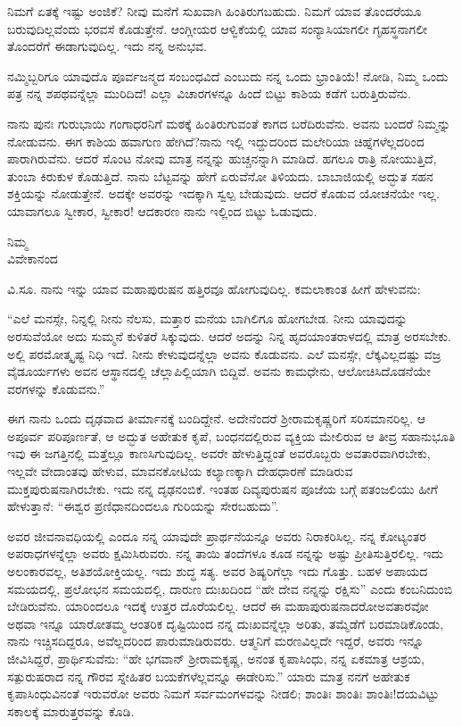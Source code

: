 ನಿಮಗೆ ಏತಕ್ಕೆ ಇಷ್ಟು ಅಂಜಿಕೆ? ನೀವು ಮನೆಗೆ ಸುಖವಾಗಿ ಹಿಂತಿರುಗಬಹುದು. ನಿಮಗೆ ಯಾವ ತೊಂದರೆಯೂ ಬರುವುದಿಲ್ಲವೆಂದು ಭರವಸೆ ಕೊಡುತ್ತೇನೆ. ಆಂಗ್ಲೀಯರ ಆಳ್ವಿಕೆಯಲ್ಲಿ ಯಾವ ಸಂನ್ಯಾಸಿಯಾಗಲೀ ಗೃಹಸ್ಥನಾಗಲೀ ತೊಂದರೆಗೆ ಈಡಾಗುವುದಿಲ್ಲ. ಇದು ನನ್ನ ಅನುಭವ.

ನಮ್ಮಿಬ್ಬರಿಗೂ ಯಾವುದೊ ಪೂರ್ವಜನ್ಮದ ಸಂಬಂಧವಿದೆ ಎಂಬುದು ನನ್ನ ಒಂದು ಭ್ರಾಂತಿಯೆ! ನೋಡಿ, ನಿಮ್ಮ ಒಂದು ಪತ್ರ ನನ್ನ ಶಪಥವನ್ನೆಲ್ಲಾ ಮುರಿದಿದೆ! ಎಲ್ಲಾ ವಿಚಾರಗಳನ್ನೂ ಹಿಂದೆ ಬಿಟ್ಟು ಕಾಶಿಯ ಕಡೆಗೆ ಬರುತ್ತಿರುವೆನು.

ನಾನು ಪುನಃ ಗುರುಭಾಯಿ ಗಂಗಾಧರನಿಗೆ ಮಠಕ್ಕೆ ಹಿಂತಿರುಗುವಂತೆ ಕಾಗದ ಬರೆದಿರುವೆನು. ಅವನು ಬಂದರೆ ನಿಮ್ಮನ್ನು ನೋಡುವನು. ಈಗ ಕಾಶಿಯ ಹವಾಗುಣ ಹೇಗಿದೆ?ನಾನು ಇಲ್ಲಿ ಇದ್ದುದರಿಂದ ಮಲೇರಿಯಾ ಚಿಹ್ನೆಗಳೆಲ್ಲದರಿಂದ ಪಾರಾಗಿರುವೆನು. ಆದರೆ ಸೊಂಟ ನೋವು ಮಾತ್ರ ನನ್ನನ್ನು ಹುಚ್ಚನನ್ನಾಗಿ ಮಾಡಿದೆ. ಹಗಲೂ ರಾತ್ರಿ ನೋಯುತ್ತಿದೆ, ತುಂಬಾ ಕಿರುಕುಳ ಕೊಡುತ್ತಿದೆ. ನಾನು ಬೆಟ್ಟವನ್ನು ಹೇಗೆ ಏರುವೆನೋ ತಿಳಿಯದು. ಬಾಬಾಜಿಯಲ್ಲಿ ಅದ್ಭುತ ಸಹನ ಶಕ್ತಿಯನ್ನು ನೋಡುತ್ತೇನೆ. ಅದಕ್ಕೇ ಅವರನ್ನು ಇದಕ್ಕಾಗಿ ಸ್ವಲ್ಪ ಬೇಡುವುದು. ಆದರೆ ಕೊಡುವ ಯೋಚನೆಯೇ ಇಲ್ಲ. ಯಾವಾಗಲೂ ಸ್ವೀಕಾರ, ಸ್ವೀಕಾರ! ಆದಕಾರಣ ನಾನು ಇಲ್ಲಿಂದ ಬಿಟ್ಟು ಓಡುವುದು.
\vspace{-0.3cm}

{\flushright
ನಿಮ್ಮ\\ವಿವೇಕಾನಂದ\par}

ವಿ.ಸೂ. \enginline{-}ನಾನು ಇನ್ನು ಯಾವ ಮಹಾಪುರುಷನ ಹತ್ತಿರವೂ ಹೋಗುವುದಿಲ್ಲ. ಕಮಲಾಕಾಂತ ಹೀಗೆ ಹೇಳುವನು:

“ಎಲೆ ಮನಸ್ಸೇ, ನಿನ್ನಲ್ಲಿ ನೀನು ನೆಲಸು, ಮತ್ತಾರ ಮನೆಯ ಬಾಗಿಲಿಗೂ ಹೋಗಬೇಡ. ನೀನು ಯಾವುದನ್ನು ಅರಸುವೆಯೋ ಅದು ಸುಮ್ಮನೆ ಕುಳಿತರೆ ಸಿಕ್ಕುವುದು. ಆದರೆ ಅದನ್ನು ನಿನ್ನ ಹೃದಯಾಂತರಾಳದಲ್ಲಿ ಮಾತ್ರ ಅರಸಬೇಕು. ಅಲ್ಲಿ ಪರಮೋತ್ಕೃಷ್ಟ ನಿಧಿ ಇದೆ. ನೀನು ಕೇಳುವುದನ್ನೆಲ್ಲಾ ಅವನು ಕೊಡುವನು. ಎಲೆ ಮನಸ್ಸೇ, ಲೆಕ್ಕವಿಲ್ಲದಷ್ಟು ವಜ್ರ ವೈಡೂರ್ಯಗಳು ಅವನ ಆಸ್ಥಾನದಲ್ಲಿ ಚೆಲ್ಲಾಪಿಲ್ಲಿಯಾಗಿ ಬಿದ್ದಿವೆ. ಅವನು ಕಾಮಧೇನು, ಆಲೋಚಿಸಿದೊಡನೆಯೇ ವರಗಳನ್ನು ಕೊಡುವನು.”

ಈಗ ನಾನು ಒಂದು ದೃಢವಾದ ತೀರ್ಮಾನಕ್ಕೆ ಬಂದಿದ್ದೇನೆ. ಅದೇನೆಂದರೆ ಶ‍್ರೀರಾಮ\break ಕೃಷ್ಣರಿಗೆ ಸರಿಸಮಾನರಿಲ್ಲ. ಆ ಅಪೂರ್ವ ಪರಿಪೂರ್ಣತೆ, ಆ ಅದ್ಭುತ ಅಹೇತುಕ ಕೃಪೆ, ಬಂಧನದಲ್ಲಿರುವ ವ್ಯಕ್ತಿಯ ಮೇಲಿರುವ ಆ ತೀವ್ರ ಸಹಾನುಭೂತಿ ಇವು ಈ ಜಗತ್ತಿನಲ್ಲಿ ಮತ್ತೆಲ್ಲೂ ಕಾಣಸಿಗುವುದಿಲ್ಲ. ಅವರೇ ಹೇಳುತ್ತಿದ್ದಂತೆ ಅವರೊಬ್ಬರು ಅವತಾರವಾಗಿರಬೇಕು, ಇಲ್ಲವೇ ವೇದಾಂತವು ಹೇಳುವ, ಮಾವನಕೋಟಿಯ ಕಲ್ಯಾಣಕ್ಕಾಗಿ ದೇಹಧಾರಣೆ ಮಾಡಿರುವ ಮುಕ್ತಪುರುಷನಾಗಿರಬೇಕು. ಇದು ನನ್ನ ದೃಢನಂಬಿಕೆ. ಇಂತಹ ದಿವ್ಯಪುರುಷನ ಪೂಜೆಯ ಬಗ್ಗೆ ಪತಂಜಲಿಯು ಹೀಗೆ ಹೇಳುತ್ತಾನೆ: “ಈಶ್ವರ ಪ್ರಣಿಧಾನದಿಂದಲೂ ಗುರಿಯನ್ನು ಸೇರಬಹುದು”.

ಅವರ ಜೀವನಾವಧಿಯಲ್ಲಿ ಎಂದೂ ನನ್ನ ಯಾವುದೇ ಪ್ರಾರ್ಥನೆಯನ್ನೂ ಅವರು ನಿರಾಕರಿಸಿಲ್ಲ. ನನ್ನ ಕೋಟ್ಯಂತರ ಅಪರಾಧಗಳನ್ನೆಲ್ಲಾ ಅವರು ಕ್ಷಮಿಸಿರುವರು. ನನ್ನ ತಾಯಿ ತಂದೆಗಳೂ ಕೂಡ ನನ್ನನ್ನು ಅಷ್ಟು ಪ್ರೀತಿಸುತ್ತಿರಲಿಲ್ಲ. ಇದು ಅಲಂಕಾರವಲ್ಲ, ಅತಿಶಯೋಕ್ತಿಯಲ್ಲ. ಇದು ಶುದ್ಧ ಸತ್ಯ. ಅವರ ಶಿಷ್ಯರಿಗೆಲ್ಲಾ ಇದು ಗೊತ್ತು. ಬಹಳ ಅಪಾಯದ ಸಮಯದಲ್ಲಿ, ಪ್ರಲೋಭನ ಸಮಯದಲ್ಲಿ, ದಾರುಣ ದುಃಖದಿಂದ “ಹೇ ದೇವ ನನ್ನನ್ನು ರಕ್ಷಿಸು” ಎಂದು ಕಂಬನಿದುಂಬಿ ಬೇಡಿರುವೆನು. ಯಾರಿಂದಲೂ ಇದಕ್ಕೆ ಉತ್ತರ ದೊರೆಯಲಿಲ್ಲ. ಆದರೆ ಈ ಮಹಾಪುರುಷನಾದರೋ\enginline{-}ಅವತಾರವೋ ಅಥವಾ ಇನ್ನೂ ಯಾರೋ\enginline{-}ತಮ್ಮ ಆಂತರಿಕ ದೃಷ್ಟಿಯಿಂದ ನನ್ನ ದುಃಖವನ್ನೆಲ್ಲಾ ಅರಿತು, ತಮ್ಮೆಡೆಗೆ ಬರಮಾಡಿಕೊಂಡು, ನಾನು ಇಚ್ಚಿಸದಿದ್ದರೂ, ಅವೆಲ್ಲದರಿಂದ ಪಾರುಮಾಡಿರುವರು. ಆತ್ಮನಿಗೆ ಮರಣವಿಲ್ಲದೇ ಇದ್ದರೆ, ಅವರು ಇನ್ನೂ ಜೀವಿಸಿದ್ದರೆ, ಪ್ರಾರ್ಥಿಸುವೆನು: “ಹೇ ಭಗವಾನ್ ಶ‍್ರೀರಾಮಕೃಷ್ಣ, ಅನಂತ ಕೃಪಾಸಿಂಧು, ನನ್ನ ಏಕಮಾತ್ರ ಆಶ್ರಯ, ಸತ್ಪುರುಷರಾದ ನನ್ನ ಗೌರವ ಸ್ನೇಹಿತರ ಬಯಕೆಗಳೆಲ್ಲವನ್ನೂ ಈಡೇರಿಸು.” ಯಾರು ಮಾತ್ರ ನನಗೆ ಅಹೇತುಕ ಕೃಪಾಸಿಂಧುವಿನಂತೆ ಇರುವರೋ ಅವರು ನಿಮಗೆ ಸರ್ವಮಂಗಳವನ್ನು ನೀಡಲಿ; ಶಾಂತಿಃ ಶಾಂತಿಃ ಶಾಂತಿಃ!ದಯವಿಟ್ಟು ಸಕಾಲಕ್ಕೆ ಮಾರುತ್ತರವನ್ನು ಕೊಡಿ.

